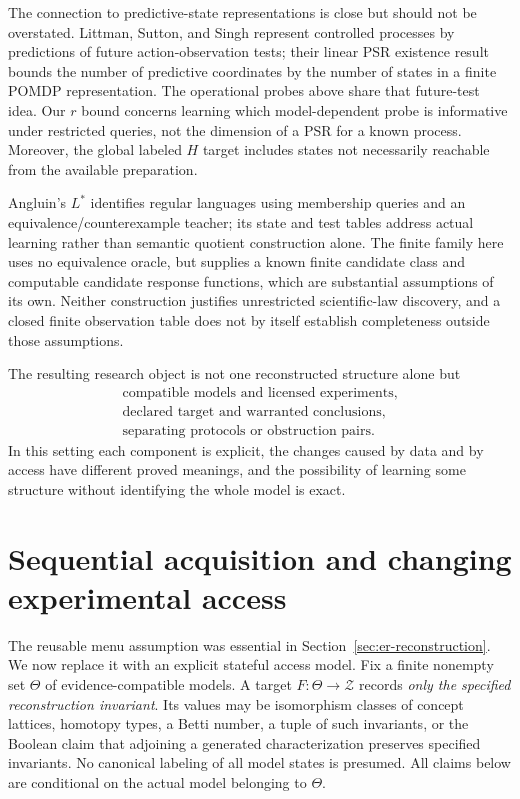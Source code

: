 \documentclass[11pt]{article}
\theoremstyle{definition}
\begin{document}
The connection to predictive-state representations is close but should not
be overstated. Littman, Sutton, and Singh represent controlled processes by
predictions of future action-observation tests; their linear PSR existence
result bounds the number of predictive coordinates by the number of states
in a finite POMDP representation. The operational probes above share that
future-test idea. Our $r$ bound concerns learning which model-dependent
probe is informative under restricted queries, not the dimension of a PSR
for a known process. Moreover, the global labeled $H$ target includes states
not necessarily reachable from the available preparation.
\cite{LittmanSuttonSingh}

Angluin's $L^*$ identifies regular languages using membership queries and
an equivalence/counterexample teacher; its state and test tables address
actual learning rather than semantic quotient construction alone. The
finite family here uses no equivalence oracle, but supplies a known finite
candidate class and computable candidate response functions, which are
substantial assumptions of its own. Neither construction justifies
unrestricted scientific-law discovery, and a closed finite observation
table does not by itself establish completeness outside those assumptions.
\cite{Angluin}

The resulting research object is not one reconstructed structure alone but
\[
 \boxed{\begin{gathered}
 \text{compatible models and licensed experiments},\\
 \text{declared target and warranted conclusions},\\
 \text{separating protocols or obstruction pairs}.
 \end{gathered}}
\]
In this setting each component is explicit, the changes caused by data and
by access have different proved meanings, and the possibility of learning
some structure without identifying the whole model is exact.


\section{Sequential acquisition and changing experimental access}
\label{seq:section}

The reusable menu assumption was essential in Section~\ref{sec:er-reconstruction}. We now replace it with an explicit stateful access model. Fix a finite nonempty set $\Theta$ of evidence-compatible models. A target
$F:\Theta\to\mathcal Z$ records \emph{only the specified reconstruction
invariant}. Its values may be isomorphism classes of concept lattices,
homotopy types, a Betti number, a tuple of such invariants, or the Boolean
claim that adjoining a generated characterization preserves specified
invariants. No canonical labeling of all model states is presumed. All
claims below are conditional on the actual model belonging to $\Theta$.
\end{document}

